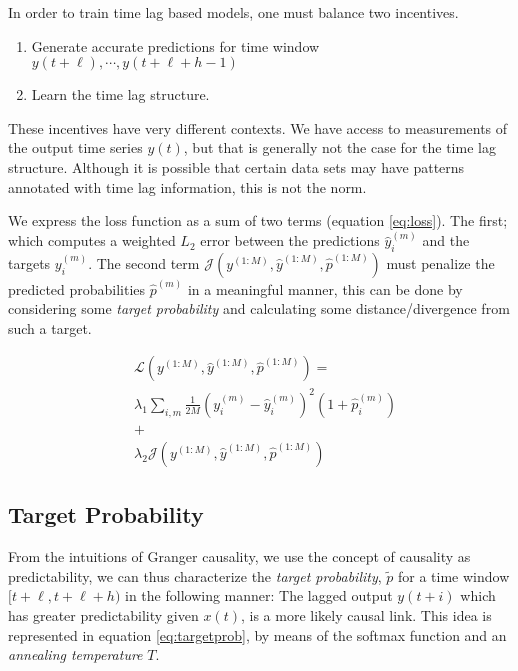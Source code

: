 \documentclass[twoside]{article}
\begin{document}
In order to train time lag based models, one must balance two incentives.

\begin{enumerate}
    \item Generate accurate predictions for time window $y(t+\ell), \cdots, y(t+\ell+h-1)$
    \item Learn the time lag structure.
\end{enumerate}

These incentives have very different contexts. We have access to measurements of the output
time series $y(t)$, but that is generally not the case for the time lag structure. Although
it is possible that certain data sets may have patterns annotated with time lag information, 
this is not the norm.

We express the loss function as a sum of two terms (equation \ref{eq:loss}). The first; which computes a weighted $L_2$ 
error between the predictions $\hat{y}^{(m)}_{i}$ and the targets $y^{(m)}_{i}$. The second term
$\mathcal{J}(y^{(1:M)}, \hat{y}^{(1:M)}, \hat{p}^{(1:M)})$ must penalize the predicted probabilities
$\hat{p}^{(m)}$ in a meaningful manner, this can be done by considering some \emph{target probability} and
calculating some distance/divergence from such a target.

\begin{equation}\label{eq:loss}
\begin{aligned}
&\mathcal{L}(y^{(1:M)}, \hat{y}^{(1:M)}, \hat{p}^{(1:M)}) = \\
&\lambda_1 \sum_{i,m}{\frac{1}{2M} (y^{(m)}_{i} - \hat{y}^{(m)}_{i})^2 (1 + \hat{p}^{(m)}_i)} \\ 
&+ \\ 
&\lambda_2 \mathcal{J}(y^{(1:M)}, \hat{y}^{(1:M)}, \hat{p}^{(1:M)})
\end{aligned}
\end{equation}

\subsection{Target Probability}

From the intuitions of Granger causality, we use the concept of causality as predictability, we can thus characterize the \emph{target probability}, $\widetilde{p}$ for a time window $[t+\ell, t+\ell+h)$ in the following manner: The lagged output $y(t+i)$ which has greater predictability given $x(t)$, is a more likely causal link. This idea is represented in equation \ref{eq:targetprob}, by means of the softmax function and an \emph{annealing temperature} $T$.
\end{document}
